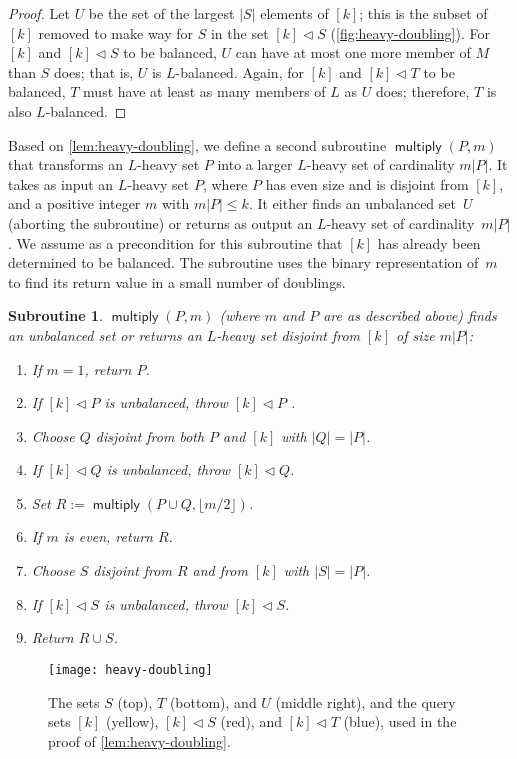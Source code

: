 \documentclass[11pt]{llncs}
\newcommand{\figurescale}{0.5}
\newcommand{\figurescale}{0.45}
\newcommand{\multsub}{\operatorname{\mathsf{multiply}}}
\newcommand{\inject}{\triangleleft}
\newcommand{\assign}{:=}
\newtheorem{subroutine}{Subroutine}
\begin{document}
\begin{proof}
Let $U$ be the set of the largest $|S|$ elements of $[k]$; this is the subset of $[k]$ removed to make way for $S$ in the set $[k]\inject S$ (\autoref{fig:heavy-doubling}). For $[k]$ and $[k]\inject S$ to be balanced, $U$ can have at most one more member of $M$ than $S$ does; that is, $U$ is $L$-balanced. Again, for $[k]$ and $[k]\inject T$ to be balanced, $T$ must have at least as many members of $L$ as $U$ does; therefore, $T$ is also $L$-balanced.
\end{proof}

Based on \autoref{lem:heavy-doubling}, we define a second subroutine $\multsub(P,m)$ that transforms an $L$-heavy set $P$ into a larger $L$-heavy set of cardinality $m|P|$. 
It takes as input an $L$-heavy set $P$, where $P$ has even size and is disjoint from $[k]$, and a positive integer $m$ with $m|P|\le k$. It either finds an unbalanced set~$U$ (aborting the subroutine) or returns as output an $L$-heavy set of cardinality~$m|P|$. We assume as a precondition for this subroutine that $[k]$ has already been determined to be balanced. The subroutine uses the binary representation of~$m$ to find its return value in a small number of doublings.
\begin{subroutine} $\multsub(P,m)$ (where $m$ and $P$ are as described above) finds an unbalanced set or returns an $L$-heavy set disjoint from $[k]$ of size $m|P|$:
\begin{enumerate}
\item If $m=1$, return $P$.
\item If $[k]\inject P$ is unbalanced, throw $[k]\inject P$ .
\item Choose $Q$ disjoint from both $P$ and $[k]$ with $|Q|=|P|$.
\item If $[k]\inject Q$ is unbalanced, throw $[k]\inject Q$.
\item Set $R\assign\multsub(P\cup Q,\lfloor m/2\rfloor)$.
\item If $m$ is even, return $R$.
\item Choose $S$ disjoint from $R$ and from $[k]$ with $|S|=|P|$.
\item If $[k]\inject S$ is unbalanced, throw $[k]\inject S$.
\item Return $R\cup S$.
\end{enumerate}
\end{subroutine}

\begin{figure}[t]
\centering\texttt{[image: heavy-doubling]}
\caption{The sets $S$ (top), $T$ (bottom), and $U$ (middle right), and the query sets $[k]$ (yellow), $[k]\inject S$ (red), and $[k]\inject T$ (blue), used in the proof of \autoref{lem:heavy-doubling}.}
\label{fig:heavy-doubling}
\end{figure}
\end{document}
